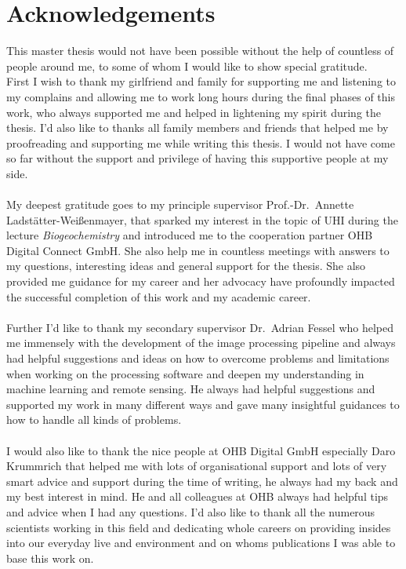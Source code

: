 \section*{Acknowledgements}
This master thesis would not have been possible without the help of countless of people around me, to some of whom I would like to show special gratitude. \\
%
First I wish to thank my girlfriend and family for supporting me and listening to my complains and allowing me to work long hours during the final phases of this work, who always supported me and helped in lightening my spirit during the thesis. 
I'd also like to thanks all family members and friends that helped me by proofreading and supporting me while writing this thesis.
I would not have come so far without the support and privilege of having this supportive people at my side.\\ \\
%
My deepest gratitude goes to my principle supervisor Prof.-Dr.~Annette Ladstätter-Weißenmayer, that sparked my interest in the topic of \gls{UHI} during the lecture \textit{Biogeochemistry} and introduced me to the cooperation partner OHB Digital Connect GmbH. 
She also help me in countless meetings with answers to my questions, interesting ideas and general support for the thesis.
She also provided me guidance for my career and her advocacy have profoundly impacted the successful completion of this work and my academic career.\\ \\
%
Further I'd like to thank my secondary supervisor Dr.\ Adrian Fessel who helped me immensely with the development of the image processing pipeline and always had helpful suggestions and ideas on how to overcome problems and limitations when working on the processing software and deepen my understanding in machine learning and remote sensing. 
He always had helpful suggestions and supported my work in many different ways and gave many insightful guidances to how to handle all kinds of problems.\\ \\
%
I would also like to thank the nice people at OHB Digital GmbH especially Daro Krummrich that helped me with lots of organisational support and lots of very smart advice and support during the time of writing, he always had my back and my best interest in mind. He and all colleagues at OHB always had helpful tips and advice when I had any questions.
%
I'd also like to thank all the numerous scientists working in this field and dedicating whole careers on providing insides into our everyday live and environment and on whoms publications I was able to base this work on. 
\afterpage{\null\thispagestyle{empty}\newpage}
\newpage
{}%
